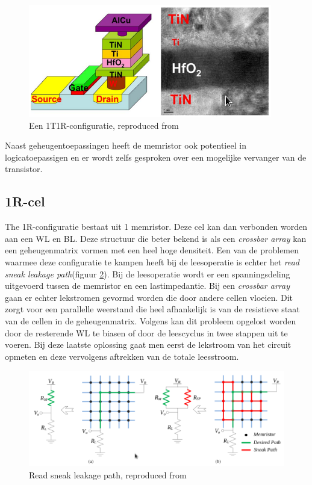 \begin{figure}
  \centering
  \includegraphics[scale=0.6]{../fig/hfdstk-cel-1T1R.png}
  \caption[Een 1T1R-configuratie]{Een 1T1R-configuratie, reproduced from\cite{Won12}}
  \label{fig:1T1R}
\end{figure}

Naast geheugentoepassingen heeft de memristor ook potentieel in logicatoepassigen en er wordt zelfs gesproken over een mogelijke vervanger van de transistor\cite{Kue05}.
\subsection{1R-cel}
\label{1R}
The 1R-configuratie bestaat uit 1 memristor. Deze cel kan dan verbonden worden aan een WL en BL. Deze structuur die beter bekend is als een \textit{crossbar array} kan een geheugenmatrix vormen met een heel hoge densiteit. Een van de problemen waarmee deze configuratie te kampen heeft bij de leesoperatie is echter het \textit{read sneak leakage path}\cite{leakpath}(figuur \ref{fig:leak}). Bij de leesoperatie wordt er een spanningsdeling uitgevoerd tussen de memristor en een lastimpedantie. Bij een \textit{crossbar array} gaan er echter lekstromen gevormd worden die door andere cellen vloeien. Dit zorgt voor een parallelle weerstand die heel afhankelijk is van de resistieve staat van de cellen in de geheugenmatrix. Volgens \cite{5763125} kan dit probleem opgelost worden door de resterende WL te biasen of door de leescyclus in twee stappen uit te voeren. Bij deze laatste oplossing gaat men eerst de lekstroom van het circuit opmeten en deze vervolgens aftrekken van de totale leesstroom.

\begin{figure}
  \centering
  \includegraphics[width=\textwidth]{../fig/hfdstk-cel-1Rleak.png}
  \caption[Read sneak leakage path]{Read sneak leakage path, reproduced from\cite{leakpath}}
  \label{fig:leak}
\end{figure}

